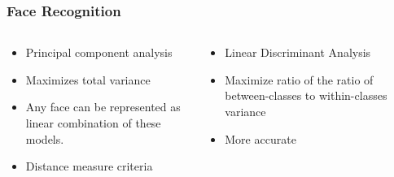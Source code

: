 \documentclass[aspectratio=149]{beamer}
\begin{document}

\begin{frame}
\frametitle{Face Recognition}
\begin{columns}
	\begin{column}{.35\textwidth}
		\begin{itemize}
			\item Principal component analysis
			\item Maximizes total variance
			\item Any face can be represented as linear combination of these models.
			\item Distance measure criteria
		\end{itemize}
	\end{column}
	\begin{column}{.35\textwidth}
		\begin{itemize}
			\item Linear Discriminant Analysis 
			\item Maximize ratio of the ratio of between-classes to within-classes variance
			\item More accurate
		\end{itemize}
	\end{column}
	\begin{column}{.35\textwidth}
		
	\end{column}
\end{columns} 

\end{frame}

\end{document}
